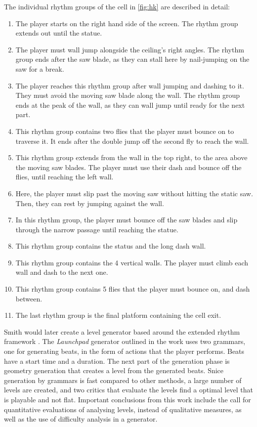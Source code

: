 The individual rhythm groups of the cell in \autoref{fig:hk} are described in detail:
\begin{enumerate}
    \item The player starts on the right hand side of the screen. The rhythm group extends out until the statue.
    \item The player must wall jump alongside the ceiling's right angles. The rhythm group ends after the saw blade, as they can stall here by nail-jumping on the saw for a break.
    \item The player reaches this rhythm group after wall jumping and dashing to it. They must avoid the moving saw blade along the wall. The rhythm group ends at the peak of the wall, as they can wall jump until ready for the next part.
    \item This rhythm group contains two flies that the player must bounce on to traverse it. It ends after the double jump off the second fly to reach the wall.
    \item This rhythm group extends from the wall in the top right, to the area above the moving saw blades. The player must use their dash and bounce off the flies, until reaching the left wall.
    \item Here, the player must slip past the moving saw without hitting the static saw. Then, they can rest by jumping against the wall.
    \item In this rhythm group, the player must bounce off the saw blades and slip through the narrow passage until reaching the statue.
    \item This rhythm group contains the status and the long dash wall.
    \item This rhythm group contains the 4 vertical walls. The player must climb each wall and dash to the next one.
    \item This rhythm group contains 5 flies that the player must bounce on, and dash between.
    \item The last rhythm group is the final platform containing the cell exit.
\end{enumerate}

Smith would later create a level generator based around the extended rhythm framework 
\cite{smith2011}. The \emph{Launchpad} generator outlined in the work uses two grammars, one
for generating beats, in the form of actions that the player performs. Beats have a start
time and a duration. The next part of the generation phase is geometry generation that
creates a level from the generated beats. Snice generation by grammars is fast compared to
other methods, a large number of levels are created, and two critics that evaluate the levels
find a optimal level that is playable and not flat. Important conclusions from this work
include the call for quantitative evaluations of analysing levels, instead of qualitative
measures, as well as the use of difficulty analysis in a generator.

